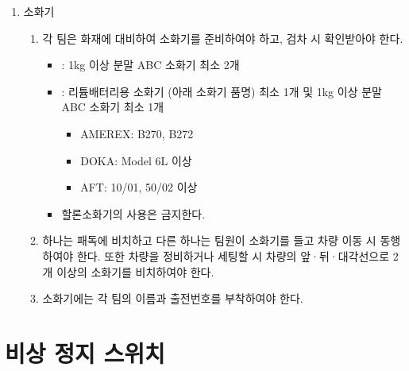 \documentclass[final,a4paper,10pt]{report}
\begin{document}
\begin{enumerate}
  \item\label{rule:formula-technical.fire-extinguishers.extinguishers} 소화기
    \begin{enumerate}
      \item\label{rule:formula-technical.fire-extinguishers.extinguishers.types-and-quantities} 각 팀은 화재에 대비하여 소화기를 준비하여야 하고, 검차 시 확인받아야 한다.
        \begin{itemize}
          \item {}: 1kg 이상 분말 ABC 소화기 최소 2개

          \item {}: 리튬배터리용 소화기 (아래 소화기 품명) 최소 1개 및 1kg 이상 분말 ABC 소화기 최소 1개
            \begin{itemize}
              \item AMEREX: B270, B272
              \item DOKA: Model 6L 이상
              \item AFT: 10/01, 50/02 이상
            \end{itemize}
          \item 할론소화기의 사용은 금지한다.
        \end{itemize}

      \item\label{rule:formula-technical.fire-extinguishers.extinguishers.placement} 하나는 패독에 비치하고 다른 하나는 팀원이 소화기를 들고 차량 이동 시 동행하여야 한다. 또한 차량을 정비하거나 세팅할 시 차량의 앞·뒤·대각선으로 2개 이상의 소화기를 비치하여야 한다.
      \item\label{rule:formula-technical.fire-extinguishers.extinguishers.labeling} 소화기에는 각 팀의 이름과 출전번호를 부착하여야 한다.
    \end{enumerate}
\end{enumerate}
\section{비상 정지 스위치}\label{rule:formula-technical.emergency-stop-switch} \label{section:비상 정지 스위치}
\end{document}
